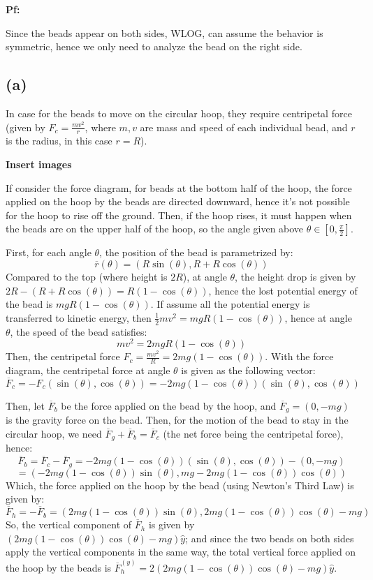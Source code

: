 \documentclass{article}
\newcommand{\br}{\overline{r}}
\newcommand{\bF}{\overline{F}}
\begin{document}
\textbf{Pf:}

Since the beads appear on both sides, WLOG, can assume the behavior is symmetric, hence we only need to analyze the bead on the right side.
\subsection*{(a)}
In case for the beads to move on the circular hoop, they require centripetal force (given by $F_c = \frac{mv^2}{r}$, where $m,v$ are mass and speed of each individual bead, and $r$ is the radius, in this case $r=R$).

\textbf{Insert images}

If consider the force diagram, for beads at the bottom half of the hoop, the force applied on the hoop by the beads are directed downward, hence it's not possible for the hoop to rise off the ground. Then, if the hoop rises, it must happen when the beads are on the upper half of the hoop, so the angle given above $\theta \in [0,\frac{\pi}{2}]$.

\hfil

First, for each angle $\theta$, the position of the bead is parametrized by:
$$\br(\theta)=(R\sin(\theta), R+R\cos(\theta))$$
Compared to the top (where height is $2R$), at angle $\theta$, the height drop is given by $2R-(R+R\cos(\theta)) = R(1-\cos(\theta))$, hence the lost potential energy of the bead is $mgR(1-\cos(\theta))$. If assume all the potential energy is transferred to kinetic energy, then $\frac{1}{2}mv^2 = mgR(1-\cos(\theta))$, hence at angle $\theta$, the speed of the bead satisfies:
$$mv^2 = 2mgR(1-\cos(\theta))$$
Then, the centripetal force $F_c = \frac{mv^2}{R} = 2mg(1-\cos(\theta))$. With the force diagram, the centripetal force at angle $\theta$ is given as the following vector:
$$\bF_c = -F_c(\sin(\theta),\cos(\theta)) = -2mg(1-\cos(\theta))(\sin(\theta),\cos(\theta))$$

\hfil

Then, let $\bF_b$ be the force applied on the bead by the hoop, and $\bF_g = (0,-mg)$ is the gravity force on the bead. Then, for the motion of the bead to stay in the circular hoop, we need $\bF_g+\bF_b = \bF_c$ (the net force being the centripetal force), hence:
$$\bF_b = \bF_c - \bF_g = -2mg(1-\cos(\theta))(\sin(\theta),\cos(\theta)) - (0,-mg)$$
$$ = \left(-2mg(1-\cos(\theta))\sin(\theta), mg-2mg(1-\cos(\theta))\cos(\theta)\right)$$
Which, the force applied on the hoop by the bead (using Newton's Third Law) is given by:
$$\bF_h = -\bF_b = \left(2mg(1-\cos(\theta))\sin(\theta), 2mg(1-\cos(\theta))\cos(\theta)-mg\right)$$
So, the vertical component of $\bF_h$ is given by $(2mg(1-\cos(\theta))\cos(\theta)-mg)\hat{y}$; and since the two beads on both sides apply the vertical components in the same way, the total vertical force applied on the hoop by the beads is $\bF_h^{(y)} = 2(2mg(1-\cos(\theta))\cos(\theta)-mg)\hat{y}$.
\end{document}
